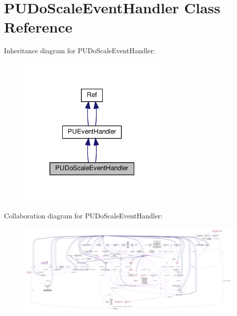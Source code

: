 \hypertarget{classPUDoScaleEventHandler}{}\section{P\+U\+Do\+Scale\+Event\+Handler Class Reference}
\label{classPUDoScaleEventHandler}


Inheritance diagram for P\+U\+Do\+Scale\+Event\+Handler\+:
\nopagebreak
\begin{figure}[H]
\begin{center}
\leavevmode
\includegraphics[width=208pt]{classPUDoScaleEventHandler__inherit__graph}
\end{center}
\end{figure}


Collaboration diagram for P\+U\+Do\+Scale\+Event\+Handler\+:
\nopagebreak
\begin{figure}[H]
\begin{center}
\leavevmode
\includegraphics[width=350pt]{classPUDoScaleEventHandler__coll__graph}
\end{center}
\end{figure}
